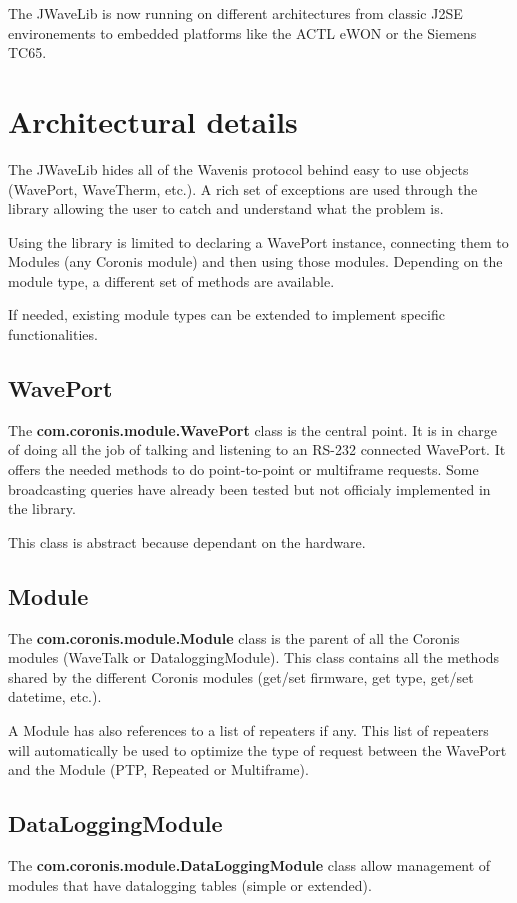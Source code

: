 \documentclass[a4paper,10pt,english]{sphinxmanual}
\begin{document}
The JWaveLib is now running on different architectures from classic J2SE
environements to embedded platforms like the ACTL eWON or the Siemens TC65.


\section{Architectural details}
\label{technical_overview:architectural-details}
The JWaveLib hides all of the Wavenis protocol behind easy to use objects
(WavePort, WaveTherm, etc.). A rich set of exceptions are used through the
library allowing the user to catch and understand what the problem is.

Using the library is limited to declaring a WavePort instance, connecting them
to Modules (any Coronis module) and then using those modules. Depending on the
module type, a different set of methods are available.

If needed, existing module types can be extended to implement specific
functionalities.


\subsection{WavePort}
\label{technical_overview:waveport}
The \textbf{com.coronis.module.WavePort} class is the central point. It is in charge
of doing all the job of talking and listening to an RS-232 connected WavePort.
It offers the needed methods to do point-to-point or multiframe requests. Some
broadcasting queries have already been tested but not officialy implemented in
the library.

This class is abstract because dependant on the hardware.


\subsection{Module}
\label{technical_overview:module}
The \textbf{com.coronis.module.Module} class is the parent of all the Coronis modules
(WaveTalk or DataloggingModule). This class contains all the methods shared by
the different Coronis modules (get/set firmware, get type, get/set datetime,
etc.).

A Module has also references to a list of repeaters if any. This list of
repeaters will automatically be used to optimize the type of request between the
WavePort and the Module (PTP, Repeated or Multiframe).


\subsection{DataLoggingModule}
\label{technical_overview:dataloggingmodule}
The \textbf{com.coronis.module.DataLoggingModule} class allow management of modules that have datalogging tables (simple or extended).
\end{document}
